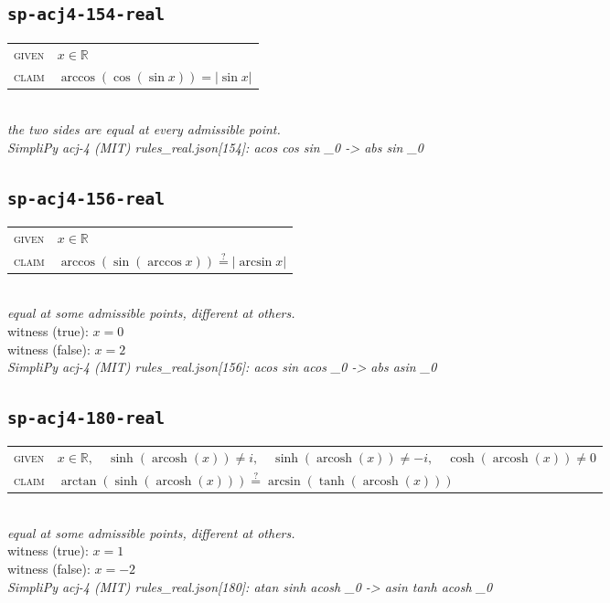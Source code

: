 \documentclass[11pt]{article}
\begin{document}
\subsection*{\texttt{sp-acj4-154-real}}
\begin{tabular}{@{}l@{\quad}l@{}}
\textsc{given} & $x \in \mathbb{R}$ \\[4pt]
\textsc{claim} & $\displaystyle \arccos\left(\cos\left(\sin x\right)\right) = \left|\sin x\right|$ \\
\end{tabular}\\[2pt]
{\small\emph{the two sides are equal at every admissible point.}}\\
\emph{SimpliPy acj-4 (MIT) rules\_real.json[154]: acos cos sin \_0  ->  abs sin \_0}\\

\subsection*{\texttt{sp-acj4-156-real}}
\begin{tabular}{@{}l@{\quad}l@{}}
\textsc{given} & $x \in \mathbb{R}$ \\[4pt]
\textsc{claim} & $\displaystyle \arccos\left(\sin\left(\arccos x\right)\right) \overset{?}{=} \left|\arcsin x\right|$ \\
\end{tabular}\\[2pt]
{\small\emph{equal at some admissible points, different at others.}}\\
{\footnotesize\color{gray}witness (true): $x = 0$}\\
{\footnotesize\color{gray}witness (false): $x = 2$}\\
\emph{SimpliPy acj-4 (MIT) rules\_real.json[156]: acos sin acos \_0  ->  abs asin \_0}\\

\subsection*{\texttt{sp-acj4-180-real}}
\begin{tabular}{@{}l@{\quad}l@{}}
\textsc{given} & $x \in \mathbb{R},\quad \sinh\left(\operatorname{arcosh}\left(x\right)\right) \neq i,\quad \sinh\left(\operatorname{arcosh}\left(x\right)\right) \neq -i,\quad \cosh\left(\operatorname{arcosh}\left(x\right)\right) \neq 0$ \\[4pt]
\textsc{claim} & $\displaystyle \arctan\left(\sinh\left(\operatorname{arcosh}\left(x\right)\right)\right) \overset{?}{=} \arcsin\left(\tanh\left(\operatorname{arcosh}\left(x\right)\right)\right)$ \\
\end{tabular}\\[2pt]
{\small\emph{equal at some admissible points, different at others.}}\\
{\footnotesize\color{gray}witness (true): $x = 1$}\\
{\footnotesize\color{gray}witness (false): $x = -2$}\\
\emph{SimpliPy acj-4 (MIT) rules\_real.json[180]: atan sinh acosh \_0  ->  asin tanh acosh \_0}\\
\end{document}

